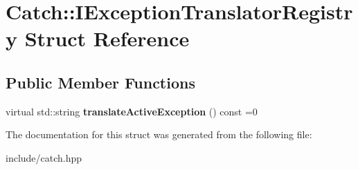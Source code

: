\hypertarget{structCatch_1_1IExceptionTranslatorRegistry}{}\section{Catch\+:\+:I\+Exception\+Translator\+Registry Struct Reference}
\label{structCatch_1_1IExceptionTranslatorRegistry}
\subsection*{Public Member Functions}
\begin{DoxyCompactItemize}
\item 
virtual std\+::string {\bfseries translate\+Active\+Exception} () const =0\hypertarget{structCatch_1_1IExceptionTranslatorRegistry_af76ae8c331a17f2a94c9720bc0d686bb}{}\label{structCatch_1_1IExceptionTranslatorRegistry_af76ae8c331a17f2a94c9720bc0d686bb}

\end{DoxyCompactItemize}


The documentation for this struct was generated from the following file\+:\begin{DoxyCompactItemize}
\item 
include/catch.\+hpp\end{DoxyCompactItemize}
